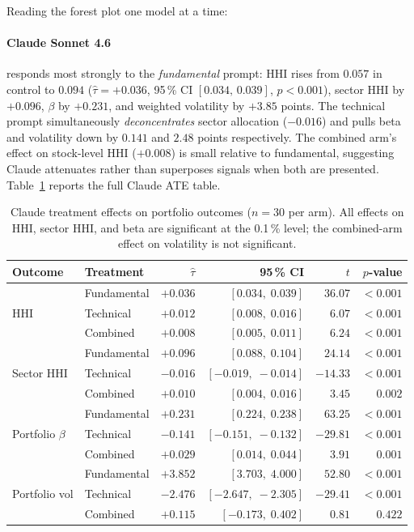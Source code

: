 \documentclass[11pt]{article}
\begin{document}
Reading the forest plot one model at a time:

\paragraph{Claude Sonnet 4.6} responds most strongly to the
\emph{fundamental} prompt: HHI rises from $0.057$ in control to $0.094$
($\hat\tau = +0.036$, 95\,\% CI $[0.034,\, 0.039]$, $p<0.001$), sector
HHI by $+0.096$, $\beta$ by $+0.231$, and weighted volatility by $+3.85$
points. The technical prompt simultaneously \emph{deconcentrates}
sector allocation ($-0.016$) and pulls beta and volatility down by
$0.141$ and $2.48$ points respectively. The combined arm's effect on
stock-level HHI ($+0.008$) is small relative to fundamental, suggesting
Claude attenuates rather than superposes signals when both are presented.
Table~\ref{tab:ate-claude} reports the full Claude ATE table.

\begin{table}[H]
\centering
\caption{Claude treatment effects on portfolio outcomes
($n=30$ per arm). All effects on HHI, sector HHI, and beta are
significant at the 0.1\,\% level; the combined-arm effect on
volatility is not significant.}
\label{tab:ate-claude}
\begin{tabular}{llrrrr}
\toprule
Outcome & Treatment & $\hat\tau$ & 95\,\% CI & $t$ & $p$-value \\
\midrule
\multirow{3}{*}{HHI}
 & Fundamental & $+0.036$ & $[0.034,\;0.039]$ & $36.07$ & $<0.001$ \\
 & Technical   & $+0.012$ & $[0.008,\;0.016]$ & $6.07$  & $<0.001$ \\
 & Combined    & $+0.008$ & $[0.005,\;0.011]$ & $6.24$  & $<0.001$ \\
\midrule
\multirow{3}{*}{Sector HHI}
 & Fundamental & $+0.096$ & $[0.088,\;0.104]$ & $24.14$ & $<0.001$ \\
 & Technical   & $-0.016$ & $[-0.019,\;-0.014]$ & $-14.33$ & $<0.001$ \\
 & Combined    & $+0.010$ & $[0.004,\;0.016]$ & $3.45$  & $0.002$ \\
\midrule
\multirow{3}{*}{Portfolio $\beta$}
 & Fundamental & $+0.231$ & $[0.224,\;0.238]$ & $63.25$ & $<0.001$ \\
 & Technical   & $-0.141$ & $[-0.151,\;-0.132]$ & $-29.81$ & $<0.001$ \\
 & Combined    & $+0.029$ & $[0.014,\;0.044]$ & $3.91$  & $0.001$ \\
\midrule
\multirow{3}{*}{Portfolio vol}
 & Fundamental & $+3.852$ & $[3.703,\;4.000]$ & $52.80$ & $<0.001$ \\
 & Technical   & $-2.476$ & $[-2.647,\;-2.305]$ & $-29.41$ & $<0.001$ \\
 & Combined    & $+0.115$ & $[-0.173,\;0.402]$ & $0.81$  & $0.422$ \\
\bottomrule
\end{tabular}
\end{table}
\end{document}
